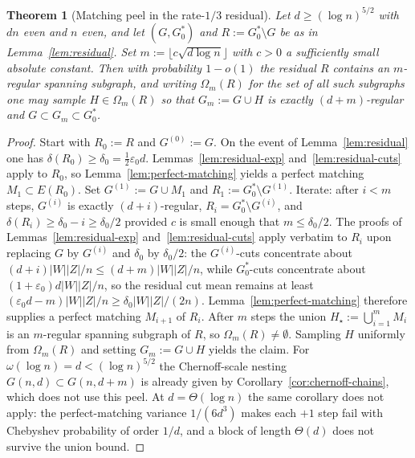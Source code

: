 \documentclass[11pt]{article}
\newtheorem{theorem}{Theorem}
\begin{document}
\begin{theorem}[Matching peel in the rate-\(1/3\) residual]
\label{thm:matching-peel}
Let \(d\ge(\log n)^{5/2}\) with \(dn\) even and \(n\) even, and let
\((G,G^*_0)\) and \(R:=G^*_0\setminus G\) be as in Lemma~\ref{lem:residual}.
Set \(m:=\lfloor c\sqrt{d\log n}\rfloor\) with \(c>0\) a sufficiently small absolute
constant.
Then with probability \(1-o(1)\) the residual \(R\) contains an \(m\)-regular spanning
subgraph, and writing \(\Omega_m(R)\) for the set of all such subgraphs one may sample
\(H\in\Omega_m(R)\) so that \(G_m:=G\cup H\) is exactly \((d+m)\)-regular and
\(G\subset G_m\subset G^*_0\).
\end{theorem}

\begin{proof}
Start with \(R_0:=R\) and \(G^{(0)}:=G\).
On the event of Lemma~\ref{lem:residual} one has
\(\delta(R_0)\ge\delta_0=\tfrac12\varepsilon_0 d\).
Lemmas~\ref{lem:residual-exp} and~\ref{lem:residual-cuts} apply to \(R_0\), so
Lemma~\ref{lem:perfect-matching} yields a perfect matching \(M_1\subset E(R_0)\).
Set \(G^{(1)}:=G\cup M_1\) and \(R_1:=G^*_0\setminus G^{(1)}\).
Iterate: after \(i<m\) steps, \(G^{(i)}\) is exactly \((d+i)\)-regular,
\(R_i=G^*_0\setminus G^{(i)}\), and \(\delta(R_i)\ge\delta_0-i\ge\delta_0/2\) provided
\(c\) is small enough that \(m\le\delta_0/2\).
The proofs of Lemmas~\ref{lem:residual-exp} and~\ref{lem:residual-cuts} apply
verbatim to \(R_i\) upon replacing \(G\) by \(G^{(i)}\) and \(\delta_0\) by
\(\delta_0/2\): the \(G^{(i)}\)-cuts concentrate about
\((d+i)|W||Z|/n\le(d+m)|W||Z|/n\), while \(G^*_0\)-cuts concentrate about
\((1+\varepsilon_0)d|W||Z|/n\), so the residual cut mean remains
at least \((\varepsilon_0 d-m)|W||Z|/n\ge\delta_0|W||Z|/(2n)\).
Lemma~\ref{lem:perfect-matching} therefore supplies a perfect matching
\(M_{i+1}\) of \(R_i\).
After \(m\) steps the union \(H_\star:=\bigcup_{i=1}^m M_i\) is an \(m\)-regular spanning
subgraph of \(R\), so \(\Omega_m(R)\neq\emptyset\).
Sampling \(H\) uniformly from \(\Omega_m(R)\) and setting \(G_m:=G\cup H\) yields
the claim.
For \(\omega(\log n)=d<(\log n)^{5/2}\) the Chernoff-scale nesting
\(G(n,d)\subset G(n,d+m)\) is already given by Corollary~\ref{cor:chernoff-chains},
which does not use this peel. At \(d=\Theta(\log n)\) the same corollary does not
apply: the perfect-matching variance \(1/(6d^3)\) makes each \(+1\) step fail with
Chebyshev probability of order \(1/d\), and a block of length \(\Theta(d)\) does not
survive the union bound.
\end{proof}
\end{document}
